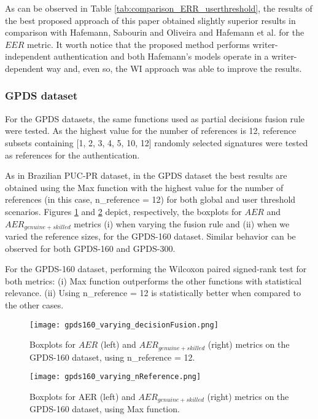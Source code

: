 \documentclass[conference]{IEEEtran}
\begin{document}
As can be observed in Table \ref{tab:comparison_ERR_userthreshold}, the results of the best proposed approach of this paper obtained slightly superior results in comparison with Hafemann, Sabourin and Oliveira \cite{hafemann:16} and Hafemann et al. \cite{hafemann:17} for the $EER$ metric. It worth notice that the proposed method performs writer-independent authentication and both Hafemann's models operate in a writer-dependent way and, even so, the WI approach was able to improve the results.




\subsubsection{GPDS dataset}
For the GPDS datasets, the same functions used as partial decisions fusion rule were tested. As the highest value for the number of references is 12, reference subsets containing [1, 2, 3, 4, 5, 10, 12] randomly selected signatures were tested as references for the authentication.


As in Brazilian PUC-PR dataset, in the GPDS dataset the best results are obtained using the Max function with the highest value for the number of references (in this case, n\_reference = 12) for both global and user threshold scenarios.  
Figures \ref{fig:gpds160_varying_decisionFusion} and \ref{fig:gpds160_varying_nReference} depict, respectively, the boxplots for $AER$ and $AER_{genuine+skilled}$ metrics (i) when varying the fusion rule and (ii) when we varied the reference sizes, for the GPDS-160 dataset. Similar behavior can be observed for both GPDS-160 and GPDS-300.


For the GPDS-160 dataset, performing the Wilcoxon paired signed-rank test for both metrics: (i) Max function outperforms
the other functions with statistical relevance. (ii) Using n\_reference = 12 is statistically better when compared to the other cases.


\begin{figure}[!htb]
\centering
  \texttt{[image: gpds160\_varying\_decisionFusion.png]}
  \caption{Boxplots for $AER$ (left) and $AER_{genuine+skilled}$ (right) metrics on the GPDS-160 dataset, using n\_reference = 12.}
  \label{fig:gpds160_varying_decisionFusion}
\end{figure}


\begin{figure}[!htb]
\centering
  \texttt{[image: gpds160\_varying\_nReference.png]}
  \caption{Boxplots for AER (left) and $AER_{genuine+skilled}$ (right) metrics on the GPDS-160 dataset, using Max function.}
  \label{fig:gpds160_varying_nReference}
\end{figure}
\end{document}
